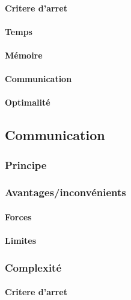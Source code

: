 \documentclass[a4paper, 10pt]{article}
\begin{document}
\paragraph{Critere d'arret}

\paragraph{Temps}

\paragraph{Mémoire}

\paragraph{Communication}

\paragraph{Optimalité}

\subsection{Communication}

\subsubsection{Principe}

\subsubsection{Avantages/inconvénients}

\paragraph{Forces}

\paragraph{Limites}

\subsubsection{Complexité}

\paragraph{Critere d'arret}
\end{document}
